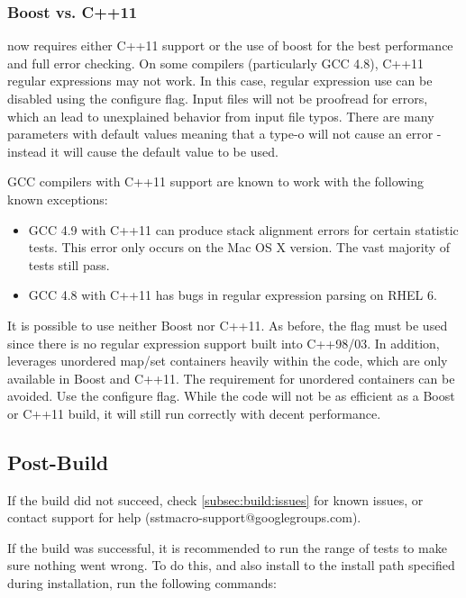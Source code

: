 \subsubsection{Boost vs. C++11}
\sstmacro now requires either C++11 support or the use of boost for the best performance and full error checking.
On some compilers (particularly GCC 4.8), C++11 regular expressions may not work.  In this case, regular expression use can be disabled using the  configure flag. Input files will not be proofread for errors, which an lead to unexplained behavior from input file typos.  There are many parameters with default values meaning that a type-o will not cause an error - instead it will cause the default value to be used. 

GCC compilers with C++11 support are known to work with the following known exceptions:

\begin{itemize}
\item GCC 4.9 with C++11 can produce stack alignment errors for certain statistic tests.
This error only occurs on the Mac OS X version. The vast majority of tests still pass.
\item GCC 4.8 with C++11 has bugs in regular expression parsing on RHEL 6.
\end{itemize}

It is possible to use neither Boost nor C++11.
As before, the  flag must be used since there is no regular expression support built into C++98/03.
In addition, \sstmacro leverages unordered map/set containers heavily within the code, which are only available in Boost and C++11.
The requirement for unordered containers can be avoided.
Use the  configure flag.
While the code will not be as efficient as a Boost or C++11 build,
it will still run correctly with decent performance.


\subsection{Post-Build}
\label{subsec:postbuild}

If the build did not succeed, check \ref{subsec:build:issues} for known issues, or contact \sstmacro support for help (sstmacro-support@googlegroups.com).

If the build was successful, it is recommended to run the range of tests to make sure nothing went wrong.  
To do this, and also install \sstmacro  to the install path specified during installation, run the following commands:

